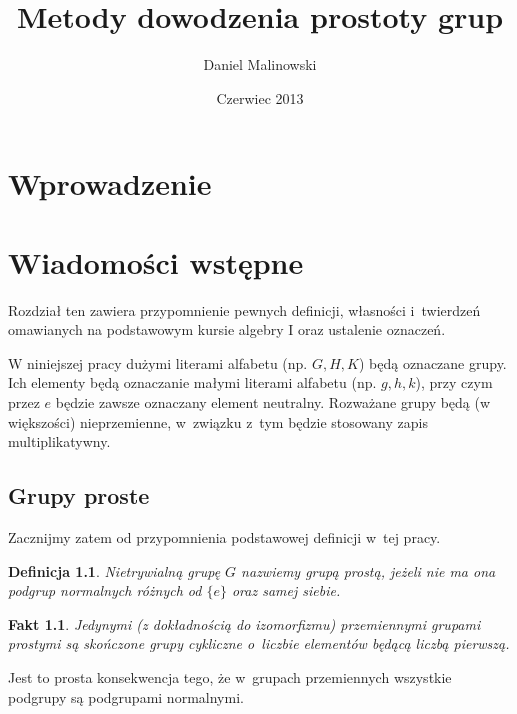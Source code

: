 \documentclass[licencjacka]{pracamgr}
\author{Daniel Malinowski}
\title{Metody dowodzenia prostoty grup}
\date{Czerwiec 2013}
\newtheorem{deff}{Definicja}[section]
\newtheorem{fact}{Fakt}[section]
\begin{document}
\maketitle

\begin{abstract}
\end{abstract}

\tableofcontents


\chapter*{Wprowadzenie}

\chapter{Wiadomości wstępne}

Rozdział ten zawiera przypomnienie pewnych definicji, własności i~twierdzeń omawianych na podstawowym kursie algebry I
oraz ustalenie oznaczeń.

W niniejszej pracy dużymi literami alfabetu (np. $G, H, K$) będą oznaczane grupy.
Ich elementy będą oznaczanie małymi literami alfabetu (np. $g, h, k$), przy czym przez $e$ będzie zawsze oznaczany element neutralny.
Rozważane grupy będą (w większości) nieprzemienne, w~związku z~tym będzie stosowany zapis multiplikatywny.

\section{Grupy proste}

Zacznijmy zatem od przypomnienia podstawowej definicji w~tej pracy.
\begin{deff}
	Nietrywialną grupę $G$ nazwiemy \emph{grupą prostą}, jeżeli nie ma ona podgrup normalnych różnych od $\{e\}$ oraz samej siebie.
\end{deff}
\begin{fact}
	Jedynymi (z dokładnością do izomorfizmu) przemiennymi grupami prostymi są skończone grupy cykliczne o~liczbie elementów będącą liczbą pierwszą.
\end{fact}
Jest to prosta konsekwencja tego, że w~grupach przemiennych wszystkie podgrupy są podgrupami normalnymi.
\end{document}
